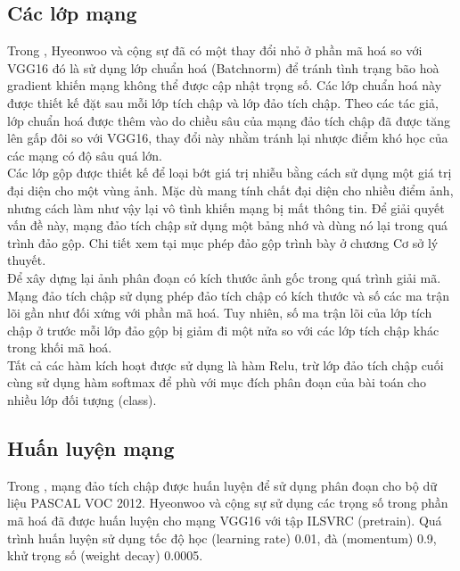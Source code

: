 \subsection{Các lớp mạng}
Trong \cite{unpoolref}, Hyeonwoo và cộng sự đã có một thay đổi nhỏ ở phần mã hoá so với VGG16 đó là sử dụng lớp chuẩn hoá (Batchnorm) để tránh tình trạng bão hoà gradient khiến mạng không thể được cập nhật trọng số. Các lớp chuẩn hoá này được thiết kế đặt sau mỗi lớp tích chập và lớp đảo tích chập. Theo các tác giả, lớp chuẩn hoá được thêm vào do chiều sâu của mạng đảo tích chập đã được tăng lên gấp đôi so với VGG16, thay đổi này nhằm tránh lại nhược điểm khó học của các mạng có độ sâu quá lớn.\\
Các lớp gộp được thiết kế để loại bớt giá trị nhiễu bằng cách sử dụng một giá trị đại diện cho một vùng ảnh. Mặc dù mang tính chất đại diện cho nhiều điểm ảnh, nhưng cách làm như vậy lại vô tình khiến mạng bị mất thông tin. Để giải quyết vấn đề này, mạng đảo tích chập sử dụng một bảng nhớ và dùng nó lại trong quá trình đảo gộp. Chi tiết xem tại mục phép đảo gộp trình bày ở chương Cơ sở lý thuyết.\\
Để xây dựng lại ảnh phân đoạn có kích thước ảnh gốc trong quá trình giải mã. Mạng đảo tích chập sử dụng phép đảo tích chập có kích thước và số các ma trận lõi gần như đối xứng với phần mã hoá. Tuy nhiên, số ma trận lõi của lớp tích chập ở trước mỗi lớp đảo gộp bị giảm đi một nửa so với các lớp tích chập khác trong khối mã hoá.\\
Tất cả các hàm kích hoạt được sử dụng là hàm Relu, trừ lớp đảo tích chập cuối cùng sử dụng hàm softmax để phù với mục đích phân đoạn của bài toán cho nhiều lớp đối tượng (class).
\subsection{Huấn luyện mạng}
Trong \cite{unpoolref}, mạng đảo tích chập được huấn luyện để sử dụng phân đoạn cho bộ dữ liệu PASCAL VOC 2012. Hyeonwoo và cộng sự sử dụng các trọng số trong phần mã hoá đã được huấn luyện cho mạng VGG16 với tập ILSVRC (pretrain). Quá trình huấn luyện sử dụng tốc độ học (learning rate) 0.01, đà (momentum) 0.9, khử trọng số (weight decay) 0.0005.

